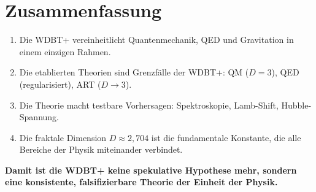 \section{Zusammenfassung}

\begin{enumerate}
    \item Die WDBT+ vereinheitlicht Quantenmechanik, QED und Gravitation in einem einzigen Rahmen.
    \item Die etablierten Theorien sind Grenzfälle der WDBT+: QM (\( D = 3 \)), QED (regularisiert), ART (\( D \to 3 \)).
    \item Die Theorie macht testbare Vorhersagen: Spektroskopie, Lamb-Shift, Hubble-Spannung.
    \item Die fraktale Dimension \( D \approx 2,704 \) ist die fundamentale Konstante, die alle Bereiche der Physik miteinander verbindet.
\end{enumerate}

\textbf{Damit ist die WDBT+ keine spekulative Hypothese mehr, sondern eine konsistente, falsifizierbare Theorie der Einheit der Physik.}
